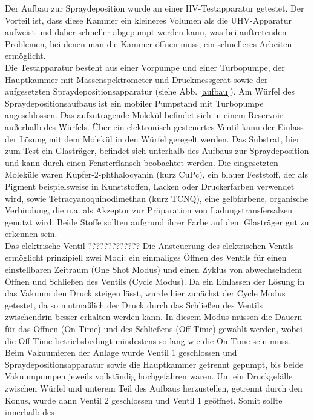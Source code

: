 Der Aufbau zur Spraydeposition wurde an einer HV-Testapparatur getestet. %
Der
Vorteil ist, dass diese Kammer ein kleineres Volumen als die UHV-Apparatur aufweist und daher
schneller abgepumpt werden kann, was bei auftretenden Problemen, bei denen man die Kammer öffnen muss, ein schnelleres Arbeiten ermöglicht.
\\
Die Testapparatur besteht aus einer Vorpumpe und  einer Turbopumpe,
der Hauptkammer mit Massenspektrometer und Druckmessgerät sowie der aufgesetzten
Spraydepositionsapparatur (siehe Abb. \ref{aufbau}). Am Würfel des Spraydepositionsaufbaus ist ein
mobiler Pumpstand mit Turbopumpe angeschlossen.
Das aufzutragende Molekül befindet sich in einem Reservoir außerhalb des Würfels. Über ein
elektronisch gesteuertes Ventil kann der Einlass der Lösung mit dem Molekül in den Würfel geregelt
werden. Das Substrat, hier zum Test ein Glasträger, befindet sich unterhalb des Aufbaus zur
Spraydeposition und kann durch einen Fensterflansch beobachtet werden. Die eingesetzten Moleküle
waren Kupfer-2-phthalocyanin (kurz CuPc), ein blauer Feststoff, der als Pigment beispielsweise in
Kunststoffen, Lacken oder Druckerfarben verwendet wird, sowie 
Tetracyanoquinodimethan (kurz TCNQ), eine gelbfarbene,
organische Verbindung, die u.a. als Akzeptor zur Präparation von Ladungstransfersalzen genutzt wird.
Beide Stoffe sollten aufgrund ihrer Farbe auf dem Glasträger gut zu erkennen sein. 
\\
Das elektrische Ventil ?????????????
Die Ansteuerung des elektrischen Ventils ermöglicht
prinzipiell zwei Modi: ein einmaliges Öffnen des
Ventils für einen einstellbaren Zeitraum (One
Shot Modus) und einen Zyklus von abwechselndem
Öffnen und Schließen des Ventils (Cycle Modus).
Da ein Einlassen der Lösung in das Vakuum
den Druck steigen lässt, wurde hier
zunächst der Cycle Modus getestet, da so
mutmaßlich der Druck durch das Schließen des
Ventils zwischendrin besser erhalten werden
kann. In diesem Modus müssen die Dauern für das
Öffnen (On-Time) und des Schließens (Off-Time)
gewählt werden, wobei die Off-Time
betriebsbedingt mindestens so lang wie die
On-Time sein muss.
\\
Beim Vakuumieren der Anlage wurde Ventil 1  geschlossen und Spraydepositionsapparatur sowie die 
 Hauptkammer getrennt gepumpt, bis beide Vakuumpumpen jeweils vollständig hochgefahren
 waren. Um ein Druckgefälle zwischen Würfel und unterem Teil des Aufbaus herzustellen, getrennt
 durch den Konus, wurde dann Ventil 2 geschlossen und Ventil 1 geöffnet. Somit sollte innerhalb des
